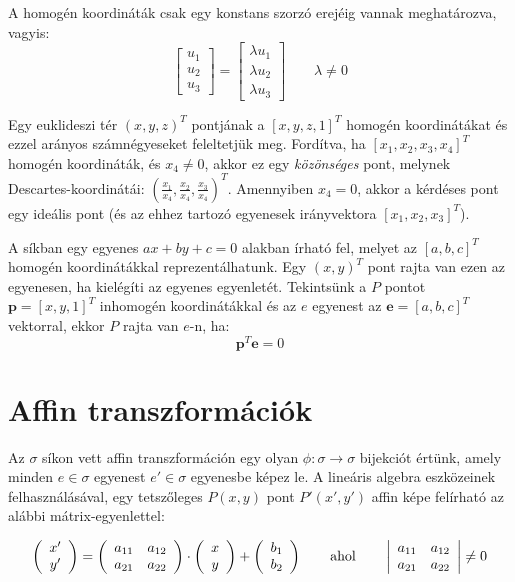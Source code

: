 A homogén koordináták csak egy konstans szorzó erejéig vannak meghatározva, vagyis:
\[\left[\begin{array}{c} u_1\\ u_2\\ u_3 \end{array}\right] = \left[\begin{array}{c} \lambda u_1\\ \lambda u_2\\ \lambda u_3 \end{array}\right] \qquad \lambda \neq 0\]

Egy euklideszi tér $(x, y, z)^T$ pontjának a $[x, y, z, 1]^T$ homogén koordinátákat és ezzel arányos számnégyeseket feleltetjük meg. Fordítva, ha $[x_1, x_2, x_3, x_4]^T$ homogén koordináták, és $x_4 \neq 0$, akkor ez egy \textit{közönséges} pont, melynek Descartes-koordinátái: $\left(\frac{x_1}{x_4}, \frac{x_2}{x_4}, \frac{x_3}{x_4}\right)^T$. Amennyiben $x_4 = 0$, akkor a kérdéses pont egy ideális pont (és az ehhez tartozó egyenesek irányvektora $[x_1, x_2, x_3]^T$).

A síkban egy egyenes $ax + by + c = 0$ alakban írható fel, melyet az $[a, b, c]^T$ homogén koordinátákkal reprezentálhatunk. Egy $(x, y)^T$ pont rajta van ezen az egyenesen, ha kielégíti az egyenes egyenletét. Tekintsünk a $P$ pontot $\mathbf{p} = [x, y, 1]^T$ inhomogén koordinátákkal és az $e$ egyenest az $\mathbf{e} = [a, b, c]^T$ vektorral, ekkor $P$ rajta van $e$-n, ha: 
\[\mathbf{p}^T \mathbf{e} = 0\]

\section{Affin transzformációk}

Az $\sigma$ síkon vett affin transzformáción egy olyan $\phi : \sigma \rightarrow \sigma$ bijekciót értünk, amely minden $e\in\sigma$ egyenest $e'\in\sigma$ egyenesbe képez le. A lineáris algebra eszközeinek felhasználásával, egy tetszőleges $P(x, y)$ pont $P'(x', y')$ affin képe felírható az alábbi mátrix-egyenlettel:

\[\left(\begin{array}{c}x' \\y'\end{array}\right) = \left(\begin{array}{cc}a_{11} & a_{12}\\a_{21} & a_{22}\\\end{array}\right) \cdot \left(\begin{array}{c}x \\y\end{array}\right) + \left(\begin{array}{c}b_1 \\b_2\end{array}\right) \qquad \hbox{ahol} \qquad  \left|\begin{array}{cc}a_{11} & a_{12}\\a_{21} & a_{22}\\\end{array}\right| \neq 0\]

